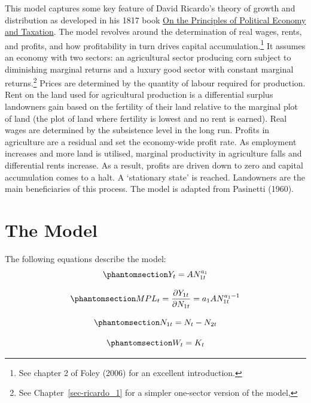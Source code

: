 \documentclass[
  letterpaper,
  DIV=11,
  numbers=noendperiod]{scrreprt}
\begin{document}
This model captures some key feature of David Ricardo's theory of growth
and distribution as developed in his 1817 book
\href{https://en.wikipedia.org/wiki/On_the_Principles_of_Political_Economy_and_Taxation}{On
the Principles of Political Economy and Taxation}. The model revolves
around the determination of real wages, rents, and profits, and how
profitability in turn drives capital accumulation.\footnote{See chapter
  2 of Foley (2006) for an excellent introduction.} It assumes an
economy with two sectors: an agricultural sector producing corn subject
to diminishing marginal returns and a luxury good sector with constant
marginal returns.\footnote{See Chapter~\ref{sec-ricardo_1} for a simpler
  one-sector version of the model,} Prices are determined by the
quantity of labour required for production. Rent on the land used for
agricultural production is a differential surplus landowners gain based
on the fertility of their land relative to the marginal plot of land
(the plot of land where fertility is lowest and no rent is earned). Real
wages are determined by the subsistence level in the long run. Profits
in agriculture are a residual and set the economy-wide profit rate. As
employment increases and more land is utilised, marginal productivity in
agriculture falls and differential rents increase. As a result, profits
are driven down to zero and capital accumulation comes to a halt. A
`stationary state' is reached. Landowners are the main beneficiaries of
this process. The model is adapted from Pasinetti (1960).

\section{The Model}\label{the-model-11}

The following equations describe the model:
\begin{equation}\phantomsection\label{eq-ricardo2_Y}{
Y_t=AN_{1t}^{a_1}
}\end{equation}

\begin{equation}\phantomsection\label{eq-ricardo2_MPL}{
MPL_t =\frac{\partial Y_{1t}}{\partial N_{1t}} =a_1AN_{1t}^{a_1-1}
}\end{equation}

\begin{equation}\phantomsection\label{eq-ricardo2_N1}{
N_{1t}=N_t - N_{2t}
}\end{equation}

\begin{equation}\phantomsection\label{eq-ricardo2_W}{
W_t=K_t
}\end{equation}
\end{document}
